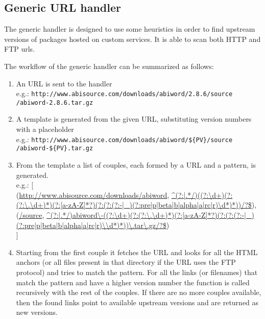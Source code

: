 \subsection{Generic URL handler}
The generic handler is designed to use some heuristics in order to find upstream versions of packages hosted on custom services. It is able to scan both HTTP and FTP urls.

The workflow of the generic handler can be summarized as follows:

\begin{enumerate}
\item An URL is sent to the handler \\ 
e.g.: \texttt{http://www.abisource.com/downloads/abiword/2.8.6/source} \\
\texttt{/abiword-2.8.6.tar.gz}

\item A template is generated from the given URL, substituting version numbers with a placeholder \\
e.g.: \texttt{http://www.abisource.com/downloads/abiword/\$\{PV\}/source} \\
\texttt{/abiword-\$\{PV\}.tar.gz}


\item From the template a list of couples, each formed by a URL and a pattern, is generated. \\
e.g.: [\\
    (\url{http://www.abisource.com/downloads/abiword}, \url{^(?:|.*/)((?:\d+)(?:(?:\.\d+)*)(?:[a-zA-Z]*?)(?:(?:(?:-|_)(?:pre|p|beta|b|alpha|a|rc|r)\d*)*))/?\$}), \\

    (\url{/source}, \url{^(?:|.*/)abiword\-((?:\d+)(?:(?:\.\d+)*)(?:[a-zA-Z]*?)(?:(?:(?:-|_)(?:pre|p|beta|b|alpha|a|rc|r)\\d*)*))\.tar\.gz/?\$}) \\
]
 
\item Starting from the first couple it fetches the URL and looks for all the HTML anchors (or all files present in that directory if the URL uses the FTP protocol) and tries to match the pattern. For all the links (or filenames) that match the pattern and have a higher version number the function is called recursively with the rest of the couples. If there are no more couples available, then the found links point to available upstream versions and are returned as new versions.
\end{enumerate}

